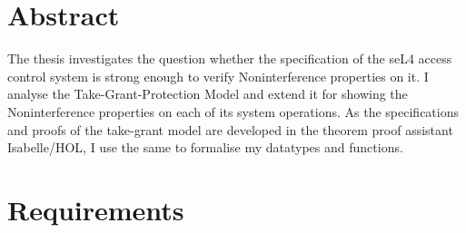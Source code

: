 \documentclass[11pt,a4paper, twoside, openright]{scrreprt}
\begin{document}
	
\deckblatt
	
	
\declaration


\chapter*{Abstract}
	
The thesis investigates the question whether the specification of the seL4 access control system is strong enough to verify Noninterference properties on it. I analyse the Take-Grant-Protection Model \cite{TakeG} and extend it for showing the Noninterference properties \cite{InfFlow} on each of its system operations. 
As the specifications and proofs of the take-grant model are developed in the theorem proof assistant Isabelle/HOL, I use the same to formalise my datatypes and functions. 
	

\listoffigures
\newpage
\tableofcontents

	
\clearpage

	 
\newpage
\chapter{Requirements}



\newpage
 



\end{document}
